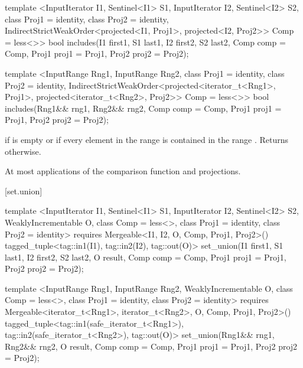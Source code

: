 %
\begin{itemdecl}
template <InputIterator I1, Sentinel<I1> S1, InputIterator I2, Sentinel<I2> S2,
    class Proj1 = identity, class Proj2 = identity,
    IndirectStrictWeakOrder<projected<I1, Proj1>, projected<I2, Proj2>> Comp = less<>>
  bool
    includes(I1 first1, S1 last1, I2 first2, S2 last2, Comp comp = Comp{},
             Proj1 proj1 = Proj1{}, Proj2 proj2 = Proj2{});

template <InputRange Rng1, InputRange Rng2, class Proj1 = identity,
    class Proj2 = identity,
    IndirectStrictWeakOrder<projected<iterator_t<Rng1>, Proj1>,
      projected<iterator_t<Rng2>, Proj2>> Comp = less<>>
  bool
    includes(Rng1&& rng1, Rng2&& rng2, Comp comp = Comp{},
             Proj1 proj1 = Proj1{}, Proj2 proj2 = Proj2{});
\end{itemdecl}

\begin{itemdescr}
\pnum
\returns
{}
if  is empty or
if every element in the range
is contained in the range
.
Returns
otherwise.

\pnum
\complexity
At most
applications of the comparison function and projections.
\end{itemdescr}

[set.union]{}

%
\begin{itemdecl}
template <InputIterator I1, Sentinel<I1> S1, InputIterator I2, Sentinel<I2> S2,
    WeaklyIncrementable O, class Comp = less<>, class Proj1 = identity, class Proj2 = identity>
  requires Mergeable<I1, I2, O, Comp, Proj1, Proj2>()
  tagged_tuple<tag::in1(I1), tag::in2(I2), tag::out(O)>
    set_union(I1 first1, S1 last1, I2 first2, S2 last2, O result, Comp comp = Comp{},
              Proj1 proj1 = Proj1{}, Proj2 proj2 = Proj2{});

template <InputRange Rng1, InputRange Rng2, WeaklyIncrementable O,
    class Comp = less<>, class Proj1 = identity, class Proj2 = identity>
  requires Mergeable<iterator_t<Rng1>, iterator_t<Rng2>, O, Comp, Proj1, Proj2>()
  tagged_tuple<tag::in1(safe_iterator_t<Rng1>),
               tag::in2(safe_iterator_t<Rng2>),
               tag::out(O)>
    set_union(Rng1&& rng1, Rng2&& rng2, O result, Comp comp = Comp{},
              Proj1 proj1 = Proj1{}, Proj2 proj2 = Proj2{});
\end{itemdecl}

